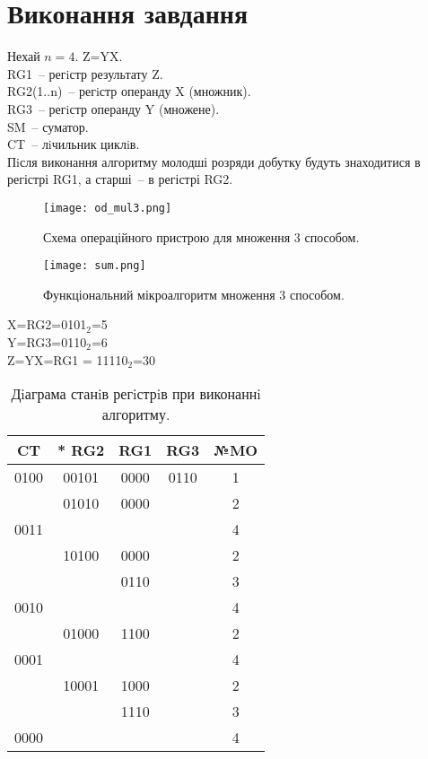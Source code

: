 \documentclass[a4paper, 10pt]{article}
\begin{document}
\section{Виконання завдання}
Нехай $n=4$. Z=YX.\\
RG1~-- регiстр результату Z.\\
RG2(1..n)~-- регiстр операнду X (множник).\\
RG3~-- регiстр операнду Y (множене).\\
SM~-- суматор.\\
CT~-- лiчильник циклiв.\\
Пiсля виконання алгоритму молодші розряди добутку будуть знаходитися в регістрі RG1, а старші~-- в регістрі RG2.
\begin{figure}[h!]
\begin{center}
\texttt{[image: od\_mul3.png]}
\caption{Схема операційного пристрою для множення 3 способом.}
\end{center}
\end{figure}

\begin{figure}[H]
\begin{center}
\texttt{[image: sum.png]}
\caption{Функціональний мікроалгоритм множення 3 способом.}
\end{center}
\end{figure}

\noindent
X=RG2=0101$_{2}$=5\\
Y=RG3=0110$_{2}$=6\\
Z=YX=RG1 = 11110$_{2}$=30\\
\begin{table}[h!]
\centering
\begin{tabular}{|c|c|c|c|c|}
\hline
 CT &* RG2& RG1& RG3& №MO\\
\hline
0100&00101&0000&0110& 1\\
    &01010&0000&    & 2\\
0011&     &    &    & 4\\
    &10100&0000&    & 2\\
    &     &0110&    & 3\\
0010&     &    &    & 4\\
    &01000&1100&    & 2\\
0001&     &    &    & 4\\
    &10001&1000&    & 2\\
    &     &1110&    & 3\\
0000&     &    &    & 4\\
\hline
\end{tabular}
\caption{Дiаграма станiв регiстрiв при виконаннi алгоритму.}
\end{table}
\end{document}
